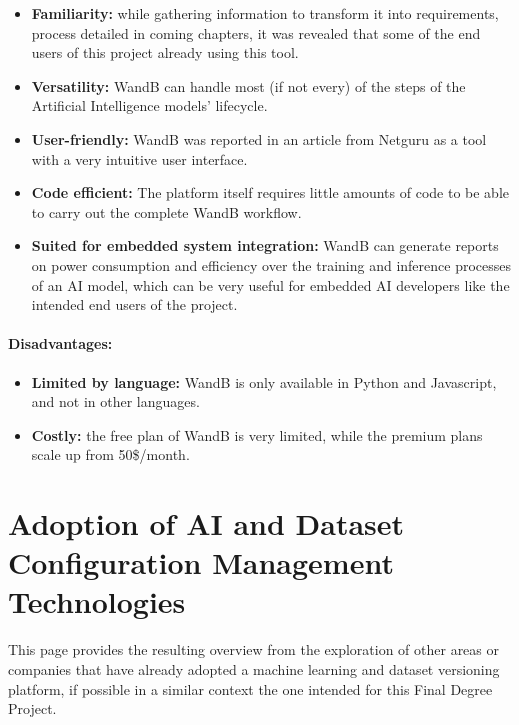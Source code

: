 \begin{itemize}
    \item \textbf{Familiarity: }while gathering information to transform it into requirements, process detailed in coming chapters, it was revealed that some of the end users of this project already 
    using this tool.

    \item \textbf{Versatility: }WandB can handle most (if not every) of the steps of the Artificial Intelligence models' lifecycle.

    \item \textbf{User-friendly: }WandB was reported in an article from Netguru\cite{wandbprosandcons} as a tool with a very intuitive user interface.
    
    \item \textbf{Code efficient: }The platform itself requires little amounts of code to be able to carry out the complete WandB workflow.
    
    \item \textbf{Suited for embedded system integration: }WandB can generate reports on power consumption and efficiency over the training and inference processes of 
    an AI model, which can be very useful for embedded AI developers like the intended end users of the project.
\end{itemize}

\paragraph{Disadvantages: }

\begin{itemize}
    \item \textbf{Limited by language: }WandB is only available in Python and Javascript, and not in other languages.
    \item \textbf{Costly: }the free plan of WandB is very limited, while the premium plans scale up from 50\$/month.
\end{itemize}

\section{Adoption of AI and Dataset Configuration Management Technologies}

This page provides the resulting overview from the exploration of other areas or companies that have already adopted a machine learning and dataset versioning platform, 
if possible in a similar context the one intended for this Final Degree Project.

